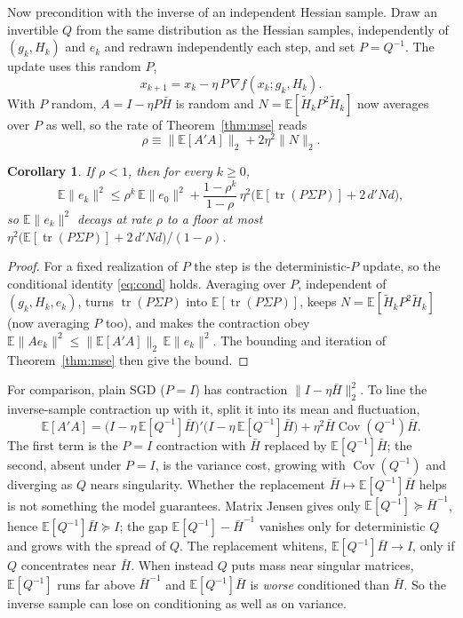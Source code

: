 \documentclass[11pt]{article}
\newcommand{\Hbar}{\bar{H}}
\newcommand{\E}{\mathbb{E}}
\newcommand{\tr}{\operatorname{tr}}
\newtheorem{corollary}{Corollary}
\begin{document}
Now precondition with the inverse of an independent Hessian sample. Draw an
invertible $Q$ from the same distribution as the Hessian samples, independently
of $(g_k,H_k)$ and $e_k$ and redrawn independently each step, and set $P=Q^{-1}$.
The update uses this random $P$,
\[
    x_{k+1}=x_k-\eta\,P\,\nabla f(x_k;g_k,H_k).
\]
With $P$ random, $A=I-\eta P\Hbar$ is random and $N=\E[\tilde{H}_k P^2\tilde{H}_k]$
now averages over $P$ as well, so the rate of Theorem~\ref{thm:mse} reads
\[
    \rho\equiv\|\E[A'A]\|_2+2\eta^2\|N\|_2 .
\]

\begin{corollary}\label{cor:stoch}
    If $\rho<1$, then for every $k\ge0$,
    \[
        \E\|e_k\|^2\le\rho^k\,\E\|e_0\|^2
        +\frac{1-\rho^k}{1-\rho}\,\eta^2\big(\E[\tr(P\Sigma P)]+2\,d'Nd\big),
    \]
    so $\E\|e_k\|^2$ decays at rate $\rho$ to a floor at most
    $\eta^2\big(\E[\tr(P\Sigma P)]+2\,d'Nd\big)/(1-\rho)$.
\end{corollary}

\begin{proof}
    For a fixed realization of $P$ the step is the deterministic-$P$ update, so the
    conditional identity \eqref{eq:cond} holds. Averaging over $P$, independent of
    $(g_k,H_k,e_k)$, turns $\tr(P\Sigma P)$ into $\E[\tr(P\Sigma P)]$, keeps
    $N=\E[\tilde{H}_k P^2\tilde{H}_k]$ (now averaging $P$ too), and makes the
    contraction obey $\E\|A e_k\|^2\le\|\E[A'A]\|_2\,\E\|e_k\|^2$. The bounding and
    iteration of Theorem~\ref{thm:mse} then give the bound.
\end{proof}

For comparison, plain SGD ($P=I$) has contraction $\|I-\eta\Hbar\|_2^2$. To line
the inverse-sample contraction up with it, split it into its mean and
fluctuation,
\[
    \E[A'A]=\big(I-\eta\,\E[Q^{-1}]\Hbar\big)'\big(I-\eta\,\E[Q^{-1}]\Hbar\big)
    +\eta^2\Hbar\operatorname{Cov}(Q^{-1})\Hbar .
\]
The first term is the $P=I$ contraction with $\Hbar$ replaced by
$\E[Q^{-1}]\Hbar$; the second, absent under $P=I$, is the variance cost, growing
with $\operatorname{Cov}(Q^{-1})$ and diverging as $Q$ nears singularity.
Whether the replacement $\Hbar\mapsto\E[Q^{-1}]\Hbar$ helps is not something the
model guarantees. Matrix Jensen gives only $\E[Q^{-1}]\succeq\Hbar^{-1}$, hence
$\E[Q^{-1}]\Hbar\succeq I$; the gap $\E[Q^{-1}]-\Hbar^{-1}$ vanishes only for
deterministic $Q$ and grows with the spread of $Q$. The replacement whitens,
$\E[Q^{-1}]\Hbar\to I$, only if $Q$ concentrates near $\Hbar$. When instead $Q$
puts mass near singular matrices, $\E[Q^{-1}]$ runs far above $\Hbar^{-1}$ and
$\E[Q^{-1}]\Hbar$ is \emph{worse} conditioned than $\Hbar$. So the inverse
sample can lose on conditioning as well as on variance.
\end{document}
